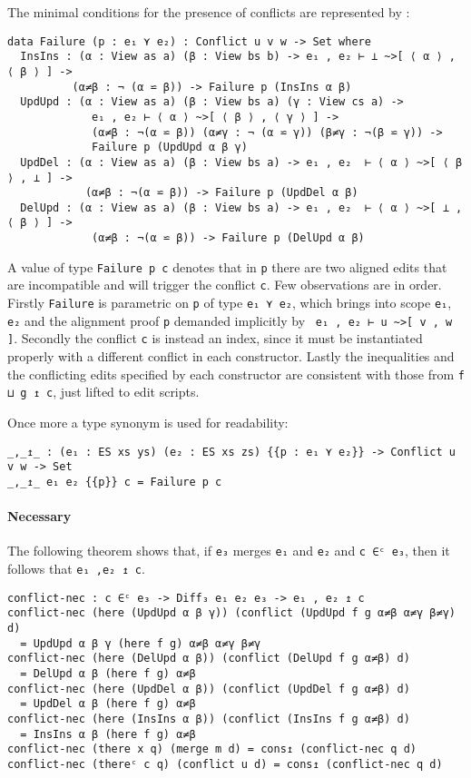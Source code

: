 \documentclass[../Thesis.tex]{subfiles}
\begin{document}
	The minimal conditions for the presence of conflicts are represented
	by :
\begin{verbatim}
data Failure (p : e₁ ⋎ e₂) : Conflict u v w -> Set where
  InsIns : (α : View as a) (β : View bs b) -> e₁ , e₂ ⊢ ⊥ ~>[ ⟨ α ⟩ , ⟨ β ⟩ ] ->
          (α≠β : ¬ (α ⋍ β)) -> Failure p (InsIns α β)
  UpdUpd : (α : View as a) (β : View bs a) (γ : View cs a) -> 
             e₁ , e₂ ⊢ ⟨ α ⟩ ~>[ ⟨ β ⟩ , ⟨ γ ⟩ ] ->
             (α≠β : ¬(α ⋍ β)) (α≠γ : ¬ (α ⋍ γ)) (β≠γ : ¬(β ⋍ γ)) -> 
             Failure p (UpdUpd α β γ)
  UpdDel : (α : View as a) (β : View bs a) -> e₁ , e₂  ⊢ ⟨ α ⟩ ~>[ ⟨ β ⟩ , ⊥ ] ->
            (α≠β : ¬(α ⋍ β)) -> Failure p (UpdDel α β)
  DelUpd : (α : View as a) (β : View bs a) -> e₁ , e₂  ⊢ ⟨ α ⟩ ~>[ ⊥ ,  ⟨ β ⟩ ] ->
             (α≠β : ¬(α ⋍ β)) -> Failure p (DelUpd α β)
\end{verbatim}

	A value of type \texttt{Failure p c} denotes that in \texttt{p} there are
	two aligned edits that are incompatible and will trigger the conflict 
	\texttt{c}.
	Few observations are in order.
	Firstly \texttt{Failure} is parametric on \texttt{p} of type \texttt{e₁ ⋎ e₂}, 
	which brings into scope \texttt{e₁}, \texttt{e₂} and the alignment proof 
	\texttt{p} demanded 
	implicitly by \texttt{ e₁ , e₂ ⊢ u \textasciitilde>[ v , w ]}.
	Secondly the conflict \texttt{c} is instead an index, since it must be
	instantiated properly with a different conflict in each constructor.
	Lastly the inequalities and the conflicting edits specified by each 
	constructor are consistent with those from \texttt{f ⊔ g ↥ c}, just lifted to
	edit scripts.

	Once more a type synonym is used for readability:
\begin{verbatim}
_,_↥_ : (e₁ : ES xs ys) (e₂ : ES xs zs) {{p : e₁ ⋎ e₂}} -> Conflict u v w -> Set
_,_↥_ e₁ e₂ {{p}} c = Failure p c 
\end{verbatim}
	
	\paragraph{Necessary}
	The following theorem shows that, if \texttt{e₃} merges \texttt{e₁} and
	\texttt{e₂} and \texttt{c ∈ᶜ e₃}, then it follows that \texttt{e₁ ,e₂ ↥ c}.
	
\begin{verbatim}
conflict-nec : c ∈ᶜ e₃ -> Diff₃ e₁ e₂ e₃ -> e₁ , e₂ ↥ c
conflict-nec (here (UpdUpd α β γ)) (conflict (UpdUpd f g α≠β α≠γ β≠γ) d) 
  = UpdUpd α β γ (here f g) α≠β α≠γ β≠γ
conflict-nec (here (DelUpd α β)) (conflict (DelUpd f g α≠β) d) 
  = DelUpd α β (here f g) α≠β
conflict-nec (here (UpdDel α β)) (conflict (UpdDel f g α≠β) d) 
  = UpdDel α β (here f g) α≠β
conflict-nec (here (InsIns α β)) (conflict (InsIns f g α≠β) d) 
  = InsIns α β (here f g) α≠β
conflict-nec (there x q) (merge m d) = cons↥ (conflict-nec q d)
conflict-nec (thereᶜ c q) (conflict u d) = cons↥ (conflict-nec q d)
\end{verbatim}
\end{document}
